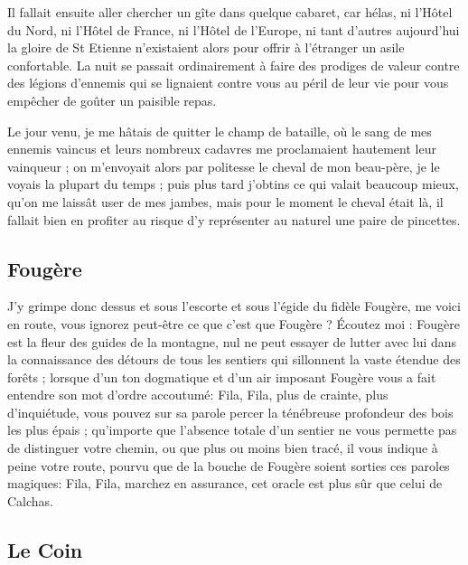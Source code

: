 \documentclass[11pt,a4paper]{report}
\begin{document}
Il fallait ensuite aller chercher un gîte dans quelque cabaret, car hélas, ni l'Hôtel du Nord, ni l'Hôtel de France, ni l'Hôtel de l'Europe, ni tant d'autres aujourd'hui la gloire de St Etienne n'existaient alors pour offrir à l'étranger un asile confortable. La nuit se passait ordinairement à faire des prodiges de valeur contre des légions d'ennemis qui se lignaient contre vous au péril de leur vie pour vous empêcher de goûter un paisible repas.

Le jour venu, je me hâtais de quitter le champ de bataille, où le sang de mes ennemis vaincus et leurs nombreux cadavres me proclamaient hautement leur vainqueur ; on m'envoyait alors par politesse le cheval de mon beau-père, je le voyais la plupart du temps ; puis plus tard j'obtins ce qui valait beaucoup mieux, qu'on me laissât user de mes jambes, mais pour le moment le cheval était là, il fallait bien en profiter au risque d'y représenter au naturel une paire de pincettes.

\subsection*{Fougère}

J'y grimpe donc dessus et sous l'escorte et sous l'égide du fidèle Fougère, me voici en route, vous ignorez peut-être ce que c'est que Fougère ? Écoutez moi : Fougère est la fleur des guides de la montagne, nul ne peut essayer de lutter avec lui dans la connaissance des détours de tous les sentiers qui sillonnent la vaste étendue des forêts ; lorsque d'un ton dogmatique et d'un air imposant Fougère vous a fait entendre son mot d'ordre accoutumé: Fila, Fila, plus de crainte, plus d'inquiétude, vous pouvez sur sa parole percer la ténébreuse profondeur des bois les plus épais ; qu'importe que l'absence totale d'un sentier ne vous permette pas de distinguer votre chemin, ou que plus ou moins bien tracé, il vous indique à peine votre route, pourvu que de la bouche de Fougère soient sorties ces paroles magiques: Fila, Fila, marchez en assurance, cet oracle est plus sûr que celui de Calchas.

\subsection*{Le Coin}
\end{document}
